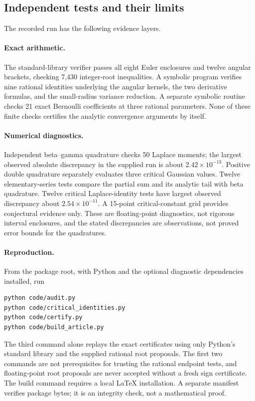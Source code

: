 \documentclass[11pt]{article}
\numberwithin{equation}{section}
\theoremstyle{definition}\newtheorem{definition}[theorem]{Definition}
\theoremstyle{remark}\newtheorem{remark}[theorem]{Remark}
\begin{document}
\subsection{Independent tests and their limits}
The recorded run has the following evidence layers.

\paragraph{Exact arithmetic.}
The standard-library verifier passes all eight Euler enclosures and
twelve angular brackets, checking 7,430 integer-root inequalities.
A symbolic program verifies nine rational identities underlying the
angular kernels, the two derivative formulas, and the small-radius
variance reduction. A separate symbolic routine checks 21 exact
Bernoulli coefficients at three rational parameters. None of these
finite checks certifies the analytic convergence arguments by itself.

\paragraph{Numerical diagnostics.}
Independent beta--gamma quadrature checks 50 Laplace moments; the
largest observed absolute discrepancy in the supplied run is about
$2.42\times10^{-13}$. Positive double quadrature separately evaluates
three critical Gaussian values. Twelve elementary-series tests compare
the partial sum and its analytic tail with beta quadrature. Twelve
critical Laplace-identity tests have largest observed discrepancy
about $2.54\times10^{-11}$. A 15-point critical-constant grid provides
conjectural evidence only. These are floating-point diagnostics, not
rigorous interval enclosures, and the stated discrepancies are
observations, not proved error bounds for the quadratures.

\paragraph{Reproduction.}
From the package root, with Python and the optional diagnostic
dependencies installed, run
\begin{verbatim}
python code/audit.py
python code/critical_identities.py
python code/certify.py
python code/build_article.py
\end{verbatim}
The third command alone replays the exact certificates using only
Python's standard library and the supplied rational root proposals.
The first two commands are not prerequisites for trusting the rational
endpoint tests, and floating-point root proposals are never accepted
without a fresh sign certificate. The build command requires a local
LaTeX installation. A separate manifest verifies package bytes; it
is an integrity check, not a mathematical proof.
\end{document}
